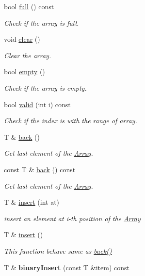 \begin{DoxyCompactItemize}
\item 
bool \hyperlink{class_i_dream_sky_1_1_array_a27c11ffe44934e006c84ef7960a7494b}{full} () const 
\begin{DoxyCompactList}\small\item\em Check if the array is full. \end{DoxyCompactList}\item 
void \hyperlink{class_i_dream_sky_1_1_array_ab360fa66b775f09c5d2cce1d14ca0798}{clear} ()
\begin{DoxyCompactList}\small\item\em Clear the array. \end{DoxyCompactList}\item 
bool \hyperlink{class_i_dream_sky_1_1_array_a7fcadd49fcd60d49692109da83670dfe}{empty} ()
\begin{DoxyCompactList}\small\item\em Check if the array is empty. \end{DoxyCompactList}\item 
bool \hyperlink{class_i_dream_sky_1_1_array_ad770172f157b0438588fac5602fb3c4b}{valid} (int i) const 
\begin{DoxyCompactList}\small\item\em Check if the index is with the range of array. \end{DoxyCompactList}\item 
T \& \hyperlink{class_i_dream_sky_1_1_array_ad1f0128f6306ec22591d68136778e79b}{back} ()
\begin{DoxyCompactList}\small\item\em Get last element of the \hyperlink{class_i_dream_sky_1_1_array}{Array}. \end{DoxyCompactList}\item 
const T \& \hyperlink{class_i_dream_sky_1_1_array_ae206e6f24a4058a269778d39831ae15f}{back} () const 
\begin{DoxyCompactList}\small\item\em Get last element of the \hyperlink{class_i_dream_sky_1_1_array}{Array}. \end{DoxyCompactList}\item 
T \& \hyperlink{class_i_dream_sky_1_1_array_ac7497313cfd8ae07890e6b45a3a8fdb1}{insert} (int at)
\begin{DoxyCompactList}\small\item\em insert an element at i-\/th position of the \hyperlink{class_i_dream_sky_1_1_array}{Array} \end{DoxyCompactList}\item 
T \& \hyperlink{class_i_dream_sky_1_1_array_a27a5ce13a7907a62ded464cf6c0884c9}{insert} ()
\begin{DoxyCompactList}\small\item\em This function behave same as \hyperlink{class_i_dream_sky_1_1_array_ad1f0128f6306ec22591d68136778e79b}{back()} \end{DoxyCompactList}\item 
T \& {\bfseries binary\+Insert} (const T \&item) const \hypertarget{class_i_dream_sky_1_1_array_a01270d73248ab4f58ac30d7b4369e003}{}\label{class_i_dream_sky_1_1_array_a01270d73248ab4f58ac30d7b4369e003}


\end{DoxyCompactItemize}

